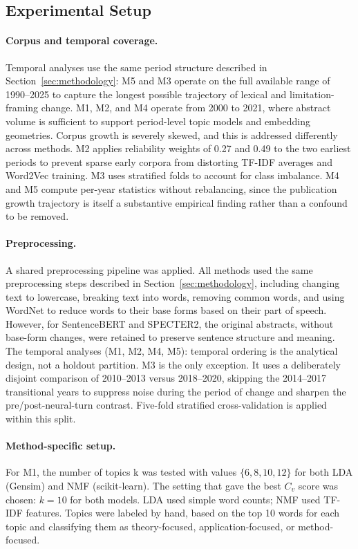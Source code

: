 \subsection{Experimental Setup}
\paragraph{Corpus and temporal coverage.}
Temporal analyses use the same period structure described in Section~\ref{sec:methodology}: M5 and M3 operate on the full available range of 1990--2025 to capture the longest possible trajectory of lexical and limitation-framing change. M1, M2, and M4 operate from 2000 to 2021, where abstract volume is sufficient to support period-level topic models and embedding geometries. Corpus growth is severely skewed, and this is addressed differently across methods. M2 applies reliability weights of 0.27 and 0.49 to the two earliest periods to prevent sparse early corpora from distorting TF-IDF averages and Word2Vec training. M3 uses stratified folds to account for class imbalance. M4 and M5 compute per-year statistics without rebalancing, since the publication growth trajectory is itself a substantive empirical finding rather than a confound to be removed.
\paragraph{Preprocessing.}
A shared preprocessing pipeline was applied. All methods used the same preprocessing steps described in Section~\ref{sec:methodology}, including changing text to lowercase, breaking text into words, removing common words, and using WordNet to reduce words to their base forms based on their part of speech. However, for SentenceBERT and SPECTER2, the original abstracts, without base-form changes, were retained to preserve sentence structure and meaning. 
The temporal analyses (M1, M2, M4, M5): temporal ordering is the analytical design, not a holdout partition. M3 is the only exception. It uses a deliberately disjoint comparison of 2010–2013 versus 2018–2020, skipping the 2014–2017 transitional years to suppress noise during the period of change and sharpen the pre/post-neural-turn contrast. Five-fold stratified cross-validation is applied within this split.

\paragraph{Method-specific setup.}
For M1, the number of topics k was tested with values $\{6, 8, 10, 12\}$ for both LDA (Gensim) and NMF (scikit-learn). The setting that gave the best $C_v$ score was chosen: $k = 10$ for both models. LDA used simple word counts; NMF used TF-IDF features. Topics were labeled by hand, based on the top 10 words for each topic and classifying them as theory-focused, application-focused, or method-focused.

